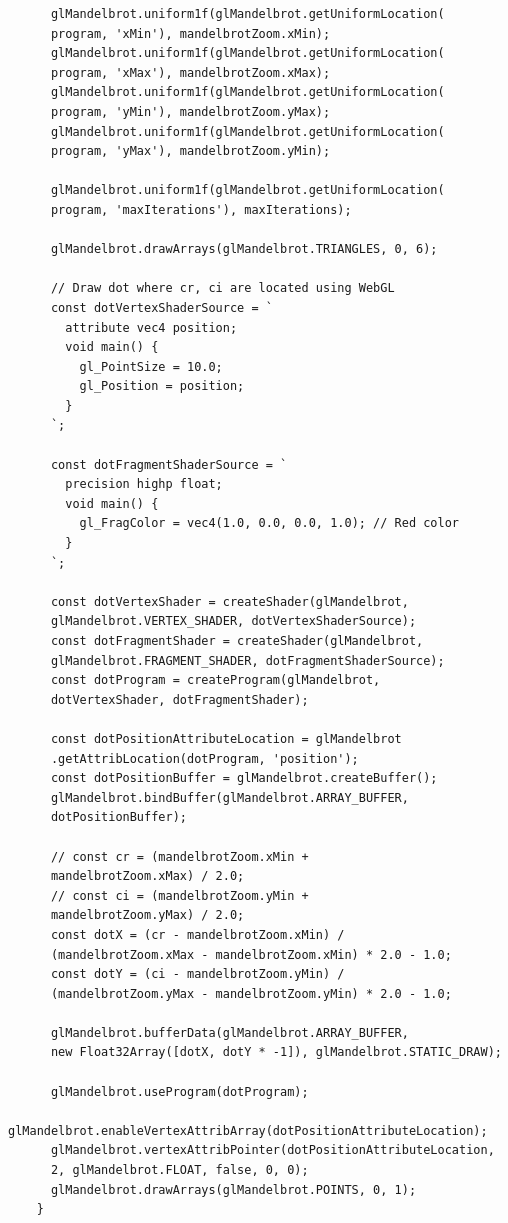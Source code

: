 \documentclass[12pt,a4paper]{report}
\begin{document}
\begin{verbatim}
      glMandelbrot.uniform1f(glMandelbrot.getUniformLocation(
      program, 'xMin'), mandelbrotZoom.xMin);
      glMandelbrot.uniform1f(glMandelbrot.getUniformLocation(
      program, 'xMax'), mandelbrotZoom.xMax);
      glMandelbrot.uniform1f(glMandelbrot.getUniformLocation(
      program, 'yMin'), mandelbrotZoom.yMax);
      glMandelbrot.uniform1f(glMandelbrot.getUniformLocation(
      program, 'yMax'), mandelbrotZoom.yMin);

      glMandelbrot.uniform1f(glMandelbrot.getUniformLocation(
      program, 'maxIterations'), maxIterations);

      glMandelbrot.drawArrays(glMandelbrot.TRIANGLES, 0, 6);

      // Draw dot where cr, ci are located using WebGL
      const dotVertexShaderSource = `
        attribute vec4 position;
        void main() {
          gl_PointSize = 10.0;
          gl_Position = position;
        }
      `;

      const dotFragmentShaderSource = `
        precision highp float;
        void main() {
          gl_FragColor = vec4(1.0, 0.0, 0.0, 1.0); // Red color
        }
      `;

      const dotVertexShader = createShader(glMandelbrot, 
      glMandelbrot.VERTEX_SHADER, dotVertexShaderSource);
      const dotFragmentShader = createShader(glMandelbrot, 
      glMandelbrot.FRAGMENT_SHADER, dotFragmentShaderSource);
      const dotProgram = createProgram(glMandelbrot, 
      dotVertexShader, dotFragmentShader);

      const dotPositionAttributeLocation = glMandelbrot
      .getAttribLocation(dotProgram, 'position');
      const dotPositionBuffer = glMandelbrot.createBuffer();
      glMandelbrot.bindBuffer(glMandelbrot.ARRAY_BUFFER, 
      dotPositionBuffer);

      // const cr = (mandelbrotZoom.xMin + 
      mandelbrotZoom.xMax) / 2.0;
      // const ci = (mandelbrotZoom.yMin + 
      mandelbrotZoom.yMax) / 2.0;
      const dotX = (cr - mandelbrotZoom.xMin) / 
      (mandelbrotZoom.xMax - mandelbrotZoom.xMin) * 2.0 - 1.0;
      const dotY = (ci - mandelbrotZoom.yMin) / 
      (mandelbrotZoom.yMax - mandelbrotZoom.yMin) * 2.0 - 1.0;

      glMandelbrot.bufferData(glMandelbrot.ARRAY_BUFFER, 
      new Float32Array([dotX, dotY * -1]), glMandelbrot.STATIC_DRAW);

      glMandelbrot.useProgram(dotProgram);
      glMandelbrot.enableVertexAttribArray(dotPositionAttributeLocation);
      glMandelbrot.vertexAttribPointer(dotPositionAttributeLocation, 
      2, glMandelbrot.FLOAT, false, 0, 0);
      glMandelbrot.drawArrays(glMandelbrot.POINTS, 0, 1);
    }


\end{verbatim}
\end{document}
